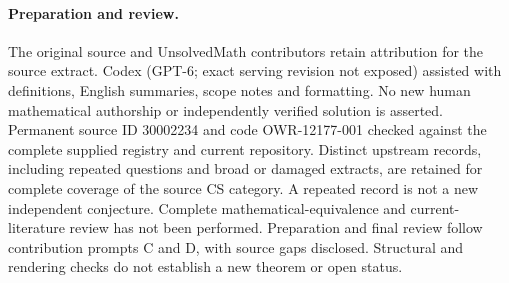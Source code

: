 \documentclass[11pt]{article}
\begin{document}
\paragraph{Preparation and review.}
The original source and UnsolvedMath contributors retain attribution for the source extract. Codex (GPT-6; exact serving revision not exposed) assisted with definitions, English summaries, scope notes and formatting. No new human mathematical authorship or independently verified solution is asserted. Permanent source ID 30002234 and code OWR-12177-001 checked against the complete supplied registry and current repository. Distinct upstream records, including repeated questions and broad or damaged extracts, are retained for complete coverage of the source CS category. A repeated record is not a new independent conjecture. Complete mathematical-equivalence and current-literature review has not been performed. Preparation and final review follow contribution prompts C and D, with source gaps disclosed. Structural and rendering checks do not establish a new theorem or open status.
\label{end:30002234}
\end{document}

